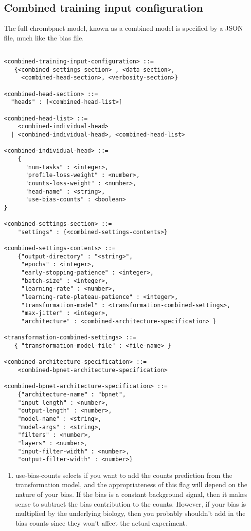 \documentclass{article}
\begin{document}
\subsection{Combined training input configuration}
The full chrombpnet model, known as a combined model is specified by a JSON file, 
much like the bias file.

\begin{lstlisting}

<combined-training-input-configuration> ::= 
   {<combined-settings-section> , <data-section>, 
     <combined-head-section>, <verbosity-section>}

<combined-head-section> ::= 
  "heads" : [<combined-head-list>]

<combined-head-list> ::= 
    <combined-individual-head>
  | <combined-individual-head>, <combined-head-list>

<combined-individual-head> ::=
    {
      "num-tasks" : <integer>,
      "profile-loss-weight" : <number>,
      "counts-loss-weight" : <number>,
      "head-name" : <string>,
      "use-bias-counts" : <boolean>
}

<combined-settings-section> ::= 
    "settings" : {<combined-settings-contents>}

<combined-settings-contents> ::= 
    {"output-directory" : "<string>",
     "epochs" : <integer>, 
     "early-stopping-patience" : <integer>, 
     "batch-size" : <integer>, 
     "learning-rate" : <number>, 
     "learning-rate-plateau-patience" : <integer>,
     "transformation-model" : <transformation-combined-settings>,
     "max-jitter" : <integer>,
     "architecture" : <combined-architecture-specification> } 

<transformation-combined-settings> ::= 
   { "transformation-model-file" : <file-name> }

<combined-architecture-specification> ::= 
    <combined-bpnet-architecture-specification>

<combined-bpnet-architecture-specification> ::= 
    {"architecture-name" : "bpnet",
    "input-length" : <number>, 
    "output-length" : <number>,
    "model-name" : <string>,
    "model-args" : <string>,
    "filters" : <number>,
    "layers" : <number>,
    "input-filter-width" : <number>,
    "output-filter-width" : <number>}
\end{lstlisting}

\begin{enumerate}
    \item use-bias-counts selects if you want to add the counts prediction from the transformation model, and the appropriateness of this flag will depend on the nature of your bias. If the bias is a constant background signal, then it makes sense to subtract the bias contribution to the counts. However, if your bias is multiplied by the underlying biology, then you probably shouldn't add in the bias counts since they won't affect the actual experiment. 
\end{enumerate}
\end{document}
